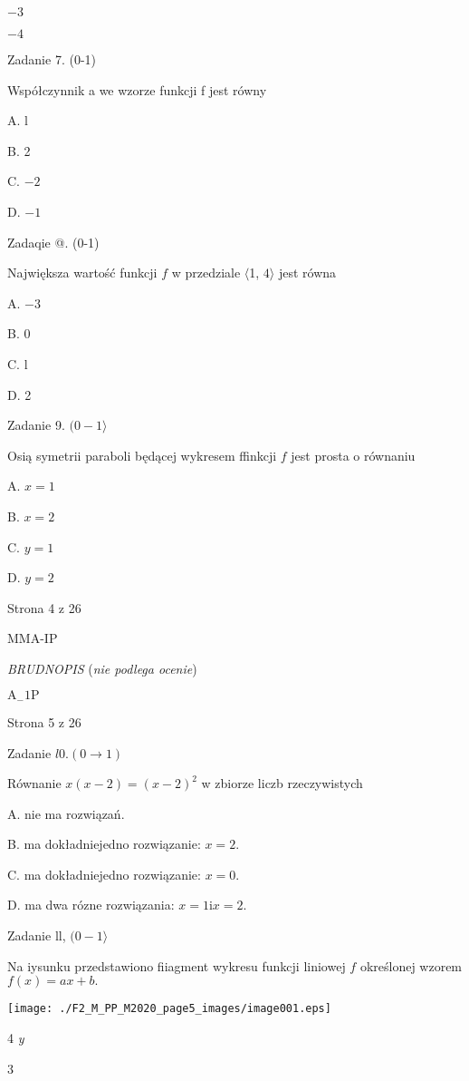 \documentclass[a4paper,12pt]{article}
\begin{document}
$-3$

$-4$

Zadanie 7. (0-1)

Współczynnik a we wzorze funkcji f jest równy

A. l

B. 2

C. $-2$

D. $-1$

Zadaqie @. (0-1)

Największa wartość funkcji $f$ w przedziale $\langle$1, $ 4\rangle$ jest równa

A. $-3$

B. 0

C. l

D. 2

Zadanie 9. $(0-1\rangle$

Osią symetrii paraboli będącej wykresem ffinkcji $f$ jest prosta o równaniu

A. $x=1$

B. $x=2$

C. $y=1$

D. $y=2$

Strona 4 z 26

MMA-IP





{\it BRUDNOPIS} ({\it nie podlega ocenie})

$\mathrm{A}_{-}1\mathrm{P}$

Strona 5 z 26





Zadanie $l0. (0\rightarrow 1)$

Równanie $x(x-2)=(x-2)^{2}$ w zbiorze liczb rzeczywistych

A. nie ma rozwiązań.

B. ma dokładniejedno rozwiązanie: $x=2.$

C. ma dokładniejedno rozwiązanie: $x=0.$

D. ma dwa rózne rozwiązania: $x=1 \mathrm{i}x=2.$

Zadanie ll, $(0-1\rangle$

Na iysunku przedstawiono fiiagment wykresu funkcji liniowej $f$ określonej wzorem $f(x)=ax+b.$
\begin{center}
\texttt{[image: ./F2\_M\_PP\_M2020\_page5\_images/image001.eps]}
\end{center}
4  {\it y}

3
\end{document}
